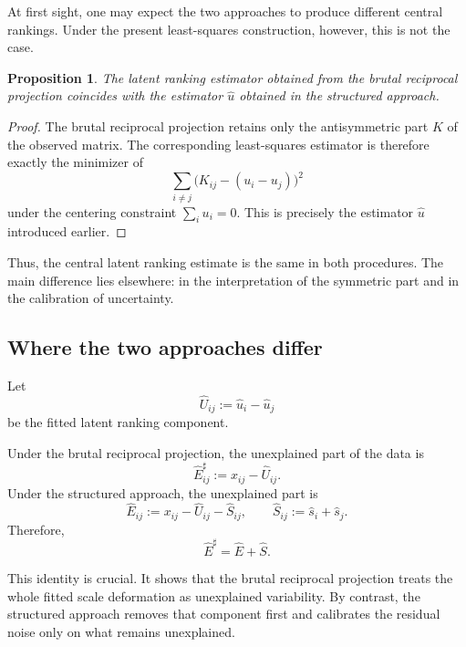 \documentclass[11pt]{amsart}
\theoremstyle{definition}
\theoremstyle{plain}
\newtheorem{proposition}[definition]{Proposition}
\numberwithin{equation}{section}
\begin{document}
At first sight, one may expect the two approaches to produce different central rankings. Under the present least-squares construction, however, this is not the case.

\begin{proposition}
The latent ranking estimator obtained from the brutal reciprocal projection coincides with the estimator $\widehat u$ obtained in the structured approach.
\end{proposition}

\begin{proof}
The brutal reciprocal projection retains only the antisymmetric part $K$ of the observed matrix. The corresponding least-squares estimator is therefore exactly the minimizer of
\[
\sum_{i\neq j}\bigl(K_{ij}-(u_i-u_j)\bigr)^2
\]
under the centering constraint $\sum_i u_i=0$. This is precisely the estimator $\widehat u$ introduced earlier.
\end{proof}

Thus, the central latent ranking estimate is the same in both procedures. The main difference lies elsewhere: in the interpretation of the symmetric part and in the calibration of uncertainty.

\subsection{Where the two approaches differ}

Let
\[
\widehat U_{ij}:=\widehat u_i-\widehat u_j
\]
be the fitted latent ranking component.

Under the brutal reciprocal projection, the unexplained part of the data is
\begin{equation}\label{eq:ebrutalcorr}
\widehat E^\sharp_{ij}:=x_{ij}-\widehat U_{ij}.
\end{equation}
Under the structured approach, the unexplained part is
\begin{equation}\label{eq:estructcorr}
\widehat E_{ij}:=x_{ij}-\widehat U_{ij}-\widehat S_{ij},
\qquad
\widehat S_{ij}:=\widehat s_i+\widehat s_j.
\end{equation}
Therefore,
\begin{equation}\label{eq:ebrutalstructcorr}
\widehat E^\sharp=\widehat E+\widehat S.
\end{equation}

This identity is crucial. It shows that the brutal reciprocal projection treats the whole fitted scale deformation as unexplained variability. By contrast, the structured approach removes that component first and calibrates the residual noise only on what remains unexplained.
\end{document}
